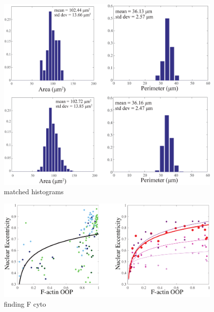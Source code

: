 \begin{figure}[h]
\centering
\captionsetup{width=.9\linewidth}
\includegraphics[width=4.5in]{Project3/figs/matching_histograms_areaandperim.eps}
\caption{matched histograms}
\label{fig::histos}
\end{figure}

\begin{figure}[h]
\centering
\captionsetup{width=.9\linewidth}
\includegraphics[width=4.5in]{Project3/figs/EccentricityvsOOP.pdf}
\caption{finding F cyto}
\label{fig::eccopp}
\end{figure}



